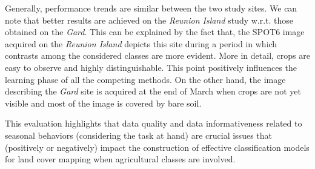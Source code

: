 \documentclass[journal]{IEEEtran}
\begin{document}
Generally, performance trends are similar between the two study sites. We can note that better results are achieved on the \textit{Reunion Island} study w.r.t. those obtained on the \textit{Gard}. This can be explained by the fact that, the SPOT6 image acquired on the \textit{Reunion Island} depicts this site during a period in which contrasts among the considered classes are more evident. More in detail, crops are easy to observe and highly distinguishable. This point positively influences the learning phase of all the competing methods. On the other hand, the image describing the \textit{Gard} site is acquired at the end of March when crops are not yet visible and most of the image is covered by bare soil.

This evaluation highlights that data quality and data informativeness related to seasonal behaviors (considering the task at hand) are crucial issues that (positively or negatively) impact the construction of effective classification models for land cover mapping when agricultural classes are involved.
\end{document}

